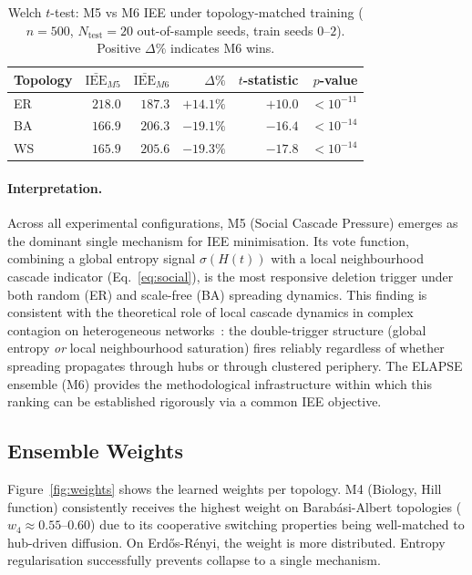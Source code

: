 \documentclass[review,12pt]{elsarticle}
\begin{document}
\begin{table}[htbp]
  \caption{Welch $t$-test: M5 vs M6 IEE under topology-matched training
           ($n=500$, $N_{\mathrm{test}}=20$ out-of-sample seeds,
           train seeds $0$--$2$).  Positive $\Delta\%$ indicates M6 wins.}
  \label{tab:ttest}
  \centering
  \small
  \begin{tabular}{lrrrrr}
    \toprule
    Topology & $\bar{\mathrm{IEE}}_{M5}$ & $\bar{\mathrm{IEE}}_{M6}$
             & $\Delta\%$ & $t$-statistic & $p$-value \\
    \midrule
    ER & $218.0$ & $187.3$ & $+14.1\%$ & $+10.0$ & $<10^{-11}$ \\
    BA & $166.9$ & $206.3$ & $-19.1\%$ & $-16.4$ & $<10^{-14}$ \\
    WS & $165.9$ & $205.6$ & $-19.3\%$ & $-17.8$ & $<10^{-14}$ \\
    \bottomrule
  \end{tabular}
\end{table}

\paragraph{Interpretation.}
Across all experimental configurations, M5 (Social Cascade Pressure)
emerges as the dominant single mechanism for IEE minimisation.  Its
vote function, combining a global entropy signal $\sigma(H(t))$ with
a local neighbourhood cascade indicator (Eq.~\eqref{eq:social}), is
the most responsive deletion trigger under both random (ER) and
scale-free (BA) spreading dynamics.  This finding is consistent with
the theoretical role of local cascade dynamics in complex contagion
on heterogeneous networks~\cite{watts2002simple,guilbeault2018complex}:
the double-trigger structure (global entropy \emph{or} local neighbourhood
saturation) fires reliably regardless of whether spreading propagates
through hubs or through clustered periphery.  The ELAPSE ensemble (M6)
provides the methodological infrastructure within which this ranking
can be established rigorously via a common IEE objective.

\subsection{Ensemble Weights}

Figure~\ref{fig:weights} shows the learned weights per topology. M4
(Biology, Hill function) consistently receives the highest weight on
Barab\'asi-Albert topologies ($w_4 \approx 0.55$--$0.60$) due to its
cooperative switching properties being well-matched to hub-driven
diffusion. On Erd\H{o}s-R\'enyi, the weight is more distributed.
Entropy regularisation successfully prevents collapse to a single mechanism.
\end{document}

